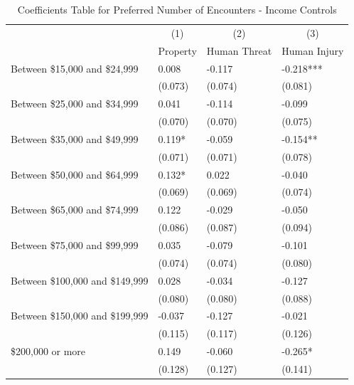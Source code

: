 \documentclass[english,12pt]{article}
\begin{document}
\begin{table}[H]
    \centering
    \caption{Coefficients Table for Preferred Number of Encounters - Income Controls}
    \footnotesize
    \begin{tabular}{@{}llll@{}}
        \toprule
                           &\multicolumn{1}{c}{(1)}   &\multicolumn{1}{c}{(2)}   &\multicolumn{1}{c}{(3)}  \\
                           & Property & Human Threat & Human Injury \\ \midrule
        Between \$15,000 and \$24,999&       0.008   &      -0.117   &      -0.218***\\
                    &     (0.073)   &     (0.074)   &     (0.081)   \\
        Between \$25,000 and \$34,999&       0.041   &      -0.114   &      -0.099   \\
                    &     (0.070)   &     (0.070)   &     (0.075)   \\
        Between \$35,000 and \$49,999&       0.119*  &      -0.059   &      -0.154** \\
                    &     (0.071)   &     (0.071)   &     (0.078)   \\
        Between \$50,000 and \$64,999&       0.132*  &       0.022   &      -0.040   \\
                    &     (0.069)   &     (0.069)   &     (0.074)   \\
        Between \$65,000 and \$74,999&       0.122   &      -0.029   &      -0.050   \\
                    &     (0.086)   &     (0.087)   &     (0.094)   \\
        Between \$75,000 and \$99,999&       0.035   &      -0.079   &      -0.101   \\
                    &     (0.074)   &     (0.074)   &     (0.080)   \\
        Between \$100,000 and \$149,999&       0.028   &      -0.034   &      -0.127   \\
                    &     (0.080)   &     (0.080)   &     (0.088)   \\
        Between \$150,000 and \$199,999&      -0.037   &      -0.127   &      -0.021   \\
                    &     (0.115)   &     (0.117)   &     (0.126)   \\
        \$200,000 or more&       0.149   &      -0.060   &      -0.265*  \\
                    &     (0.128)   &     (0.127)   &     (0.141)   \\\midrule                       

\end{tabular}
\end{table}
\end{document}
